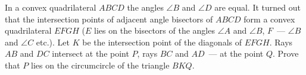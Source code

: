 \problem
In a convex quadrilateral $ABCD$ the angles $\angle B$ and $\angle D$
are equal.
It turned out that the intersection points of adjacent angle bisectors
of $ABCD$ form a convex quadrilateral $EFGH$
($E$ lies on the bisectors of the angles $\angle A$ and $\angle B$, $F$~---
$\angle B$ and $\angle C$ etc.).
Let $K$ be the intersection point of the diagonals of $EFGH$.
Rays $AB$ and $DC$ intersect at the point $P$, rays $BC$ and $AD$~---
at the point $Q$.
Prove that $P$ lies on the circumcircle of the triangle $BKQ$.
\solution
\endproblem
